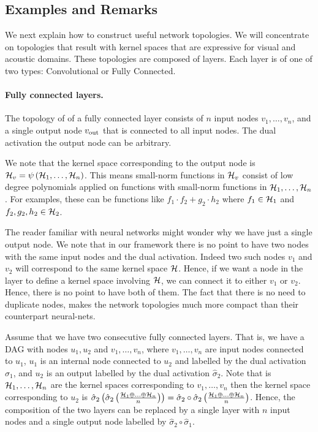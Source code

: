 \subsection{Examples and Remarks}
We next explain how to construct useful network topologies. We will concentrate on topologies that result with kernel spaces that are expressive for visual and acoustic domains.
These topologies are composed of layers. Each layer is of one of two types: Convolutional or Fully Connected.

\paragraph{Fully connected layers.}
The topology of of a fully connected layer consists of $n$ input nodes $v_1,\ldots,v_n$, and a single output node $v_{\mathrm{out}}$ that is connected to all input nodes. The dual activation the output node can be arbitrary.

We note that the kernel space corresponding to the output node is ${\cal H}_v=\psi\left({\cal H}_1,\ldots,{\cal H}_n\right)$. This means small-norm functions in ${\cal H}_v$ consist of low degree polynomials applied on functions with small-norm functions in ${\cal H}_1,\ldots,{\cal H}_n$. For examples, these can be functions like $f_1\cdot f_2+g_2\cdot h_2$ where $f_1\in{\cal H}_1$ and $f_2,g_2,h_2\in{\cal H}_2$.


\begin{remark} The reader familiar with neural networks might wonder why we have just a single output node. We note that in our framework there is no point to have two nodes with the same input nodes and the dual activation. Indeed two such nodes $v_1$ and $v_2$ will correspond to the same kernel space ${\cal H}$. Hence, if we want a node in the layer to define a kernel space involving ${\cal H}$, we can connect it to either $v_1$ or $v_2$. Hence, there is no point to have both of them.
The fact that there is no need to duplicate nodes, makes the network topologies much more compact than their counterpart neural-nets.
\end{remark}

\begin{remark}
Assume that we have two consecutive fully connected layers. That is, we have a DAG with nodes $u_1,u_2$ and $v_1,\ldots,v_n$, where $v_1,\ldots,v_n$ are input nodes connected to $u_1$, $u_1$ is an internal node connected to $u_2$ and labelled by the dual activation $\hat\sigma_1$, and $u_2$ is an output labelled by the dual activation $\hat\sigma_2$. Note that is ${\cal H}_1,\ldots,{\cal H}_n$ are the kernel spaces corresponding to $v_1,\ldots,v_n$ then the kernel space corresponding to $u_2$ is $\hat\sigma_2\left(\hat\sigma_2\left(\frac{{\cal H}_1\oplus\ldots\oplus{\cal H}_n}{n}\right)\right)=\hat\sigma_2\circ\hat\sigma_2\left(\frac{{\cal H}_1\oplus\ldots\oplus{\cal H}_n}{n}\right)$. Hence, the composition of the two layers can be replaced by a single layer with $n$ input nodes and a single output node labelled by $\hat{\sigma}_2\circ\hat\sigma_1$.
\end{remark}


